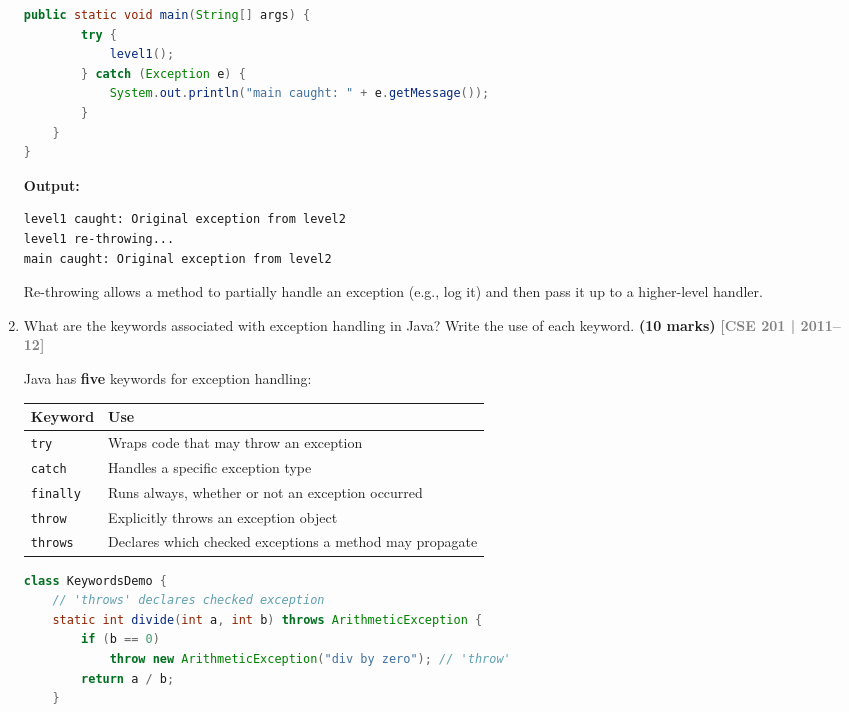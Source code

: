 \documentclass[12pt,a3paper]{article}
\newcommand{\yr}[1]{\hfill\textcolor{gray}{\small\textbf{[#1]}}}
\newcommand{\mk}[1]{\textcolor{orange!70!black}{\small\textbf{(#1 marks)}}}
\begin{document}
\begin{enumerate}
\begin{tcolorbox}[enhanced,breakable,ansbox,
  colback=cE!4,colframe=cE,boxrule=0.8pt,arc=5pt,
  title={\textbf{Answer --- Re-throwing an Exception}},
  fonttitle=\bfseries\color{white},colbacktitle=cE]
\begin{lstlisting}[language=Java]
    public static void main(String[] args) {
        try {
            level1();
        } catch (Exception e) {
            System.out.println("main caught: " + e.getMessage());
        }
    }
}
\end{lstlisting}
\textbf{Output:}
\begin{verbatim}
level1 caught: Original exception from level2
level1 re-throwing...
main caught: Original exception from level2
\end{verbatim}
Re-throwing allows a method to partially handle an exception (e.g.,
log it) and then pass it up to a higher-level handler.
\end{tcolorbox}



\item What are the keywords associated with exception handling in Java? Write the use of each keyword. \mk{10}
\yr{CSE 201 | 2011--12}

\begin{tcolorbox}[enhanced,breakable,ansbox,
  colback=cE!4,colframe=cE,boxrule=0.8pt,arc=5pt,
  title={\textbf{Answer --- Java Exception Handling Keywords}},
  fonttitle=\bfseries\color{white},colbacktitle=cE]

Java has \textbf{five} keywords for exception handling:

\begin{center}
\small
\begin{tabular}{@{}ll@{}}
\toprule
\textbf{Keyword} & \textbf{Use} \\
\midrule
\texttt{try}     & Wraps code that may throw an exception \\
\texttt{catch}   & Handles a specific exception type \\
\texttt{finally} & Runs always, whether or not an exception occurred \\
\texttt{throw}   & Explicitly throws an exception object \\
\texttt{throws}  & Declares which checked exceptions a method may propagate \\
\bottomrule
\end{tabular}
\end{center}

\begin{lstlisting}[language=Java]
class KeywordsDemo {
    // 'throws' declares checked exception
    static int divide(int a, int b) throws ArithmeticException {
        if (b == 0)
            throw new ArithmeticException("div by zero"); // 'throw'
        return a / b;
    }


\end{lstlisting}
\end{tcolorbox}
\end{enumerate}
\end{document}
